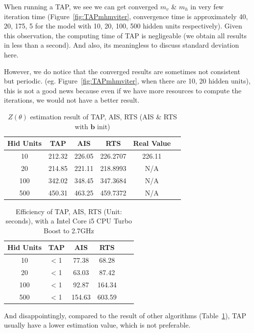 When running a TAP, we see we can get converged $m_{v}$ \& $m_{h}$ in very few iteration time (Figure~\ref{fig:TAPmhmviter}, convergence time is approximately 40, 20, 175, 5 for the model with 10, 20, 100, 500 hidden units respectively). Given this observation, the computing time of TAP is negligeable (we obtain all results in less than a second). And also, its meaningless to discuss standard deviation here.

However, we do notice that the converged results are sometimes not consistent but periodic. (eg. Figure~\ref{fig:TAPmhmviter}, when there are 10, 20 hidden units), this is not a good news because even if we have more resources to compute the iterations, we would not have a better result.

\begin{table}[t]
\centering
{\small
\begin{tabular}{c|ccccc}
    \hline
    \textbf{Hid Units} & \textbf{TAP} & \textbf{AIS} & \textbf{RTS} & \textbf{Real Value} \\ 
    \hline
	   10  & 212.32 & 226.05 & 226.2707 & 226.11 	  \\
	   20  & 214.85 & 221.11 & 218.8993 & N/A 	  \\
	   100 & 342.02 & 348.45 & 347.3684 & N/A 	  \\
	   500 & 450.31 & 463.25 & 459.7372 & N/A 	  \\ \hline
\end{tabular}
}
\vspace{-0.1in}
\caption{$Z(\theta)$ estimation result of TAP, AIS, RTS (AIS \& RTS with $\mathbf b$ init)}
\label{tab:allresult}
\end{table}
\begin{table}[t]
\centering
{\small
\begin{tabular}{c|ccccc}
    \hline
    \textbf{Hid Units} & \textbf{TAP} & \textbf{AIS} & \textbf{RTS} \\ 
    \hline
	   10  & < 1 & 77.38 & 68.28  \\
	   20  & < 1 & 63.03 & 87.42  \\
	   100 & < 1 & 92.87 & 164.34 \\
	   500 & < 1 & 154.63 & 603.59 \\ \hline
\end{tabular}
}
\vspace{-0.1in}
\caption{Efficiency of TAP, AIS, RTS (Unit: seconds), with a Intel Core i5 CPU Turbo Boost to 2.7GHz}
\label{tab:efficiencyresult}
\end{table}

And disappointingly, compared to the result of other algorithms (Table~\ref{tab:allresult}), TAP usually have a lower estimation value, which is not preferable.







